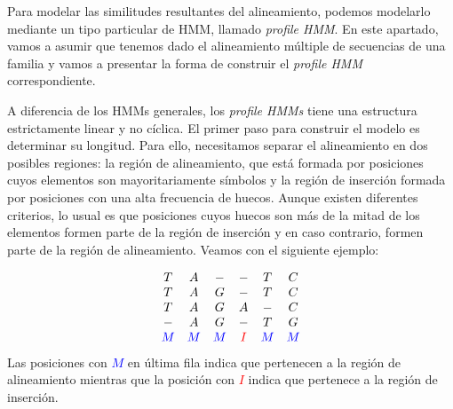 Para modelar las similitudes resultantes del alineamiento, podemos modelarlo mediante un tipo particular de HMM, llamado \textit{profile HMM}. En este apartado, vamos a asumir que tenemos dado el alineamiento múltiple de secuencias de una familia y vamos a presentar la forma de construir el \textit{profile HMM} correspondiente. 

A diferencia de los HMMs generales, los \textit{profile HMMs} tiene una estructura estrictamente linear y no cíclica. El primer paso para construir el modelo es determinar su longitud. Para ello, necesitamos separar el alineamiento en dos posibles regiones: la región de alineamiento, que está formada por posiciones cuyos elementos son mayoritariamente símbolos y la región de inserción formada por posiciones con una alta frecuencia de huecos. Aunque existen diferentes criterios, lo usual es que posiciones cuyos huecos son más de la mitad de los elementos formen parte de la región de inserción y en caso contrario, formen parte de la región de alineamiento. Veamos con el siguiente ejemplo:

\begin{exampleth} \label{alineamientoMúltiple}
    \[\begin{array}{c c c c c c}
        T & A & - & -  & T & C \\
        T & A & G & -  & T & C \\
        T & A & G & A  & - & C \\
        - & A & G & -  & T & G \\
        \textcolor{blue}{M} & \textcolor{blue}{M} & \textcolor{blue}{M} & \textcolor{red}{I} & \textcolor{blue}{M} & \textcolor{blue}{M}
    \end{array}\]    
    Las posiciones con \textcolor{blue}{$M$} en última fila indica que pertenecen a la región de alineamiento mientras que la posición con \textcolor{red}{$I$} indica que pertenece a la región de inserción.
\end{exampleth}

